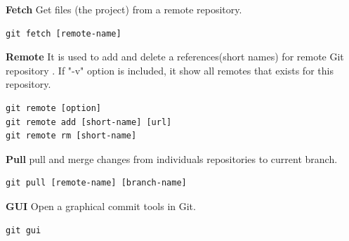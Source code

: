\documentclass[11pt]{report}
\begin{document}
\textbf{Fetch} Get files (the project) from a remote repository.
\begin{verbatim}
git fetch [remote-name]
\end{verbatim}

\textbf{Remote} It is used to add and delete a  references(short names) for remote Git repository . If "-v" option is included, it show all remotes that exists for this repository.
\begin{verbatim}
git remote [option]
git remote add [short-name] [url]
git remote rm [short-name]
\end{verbatim}

\textbf{Pull} pull and merge changes from individuals repositories to current branch.
\begin{verbatim}
git pull [remote-name] [branch-name]
\end{verbatim}

\textbf{GUI} Open a graphical commit tools in Git.
\begin{verbatim}
git gui
\end{verbatim}
\end{document}
